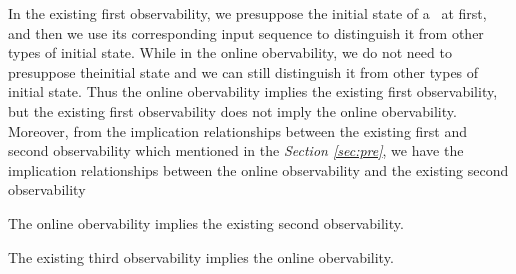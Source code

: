 In the existing first observability, we presuppose the initial state of a \BCN\ at first, and then we use its corresponding input sequence to distinguish it from other types of initial state. While in the online obervability, we do not need to presuppose theinitial state and we can still distinguish it from other types of initial state. Thus the online obervability implies the existing first observability, but the existing first observability does not imply the online obervability. Moreover, from the implication relationships between the existing first and second observability which mentioned in the {\em Section \ref{sec:pre}}, we have the implication relationships between the online observability and the existing second observability
\begin{theorem}
The online obervability implies the existing second observability.%
\label{theo:4}
\end{theorem}
\begin{theorem}
The existing third observability implies the online obervability.
\end{theorem}
